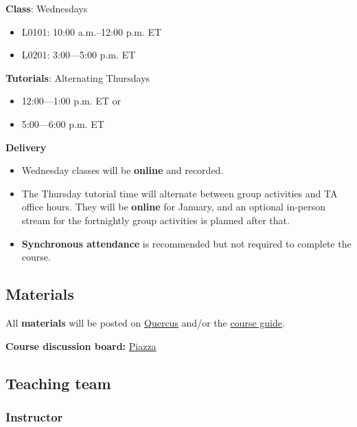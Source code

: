 \documentclass[
  openany]{book}
\providecommand{\tightlist}{%
  \setlength{\itemsep}{0pt}\setlength{\parskip}{0pt}}
\begin{document}
\textbf{Class}: Wednesdays

\begin{itemize}
\tightlist
\item
  L0101: 10:00 a.m.--12:00 p.m. ET
\item
  L0201: 3:00---5:00 p.m. ET
\end{itemize}

\textbf{Tutorials}: Alternating Thursdays

\begin{itemize}
\tightlist
\item
  12:00---1:00 p.m. ET or
\item
  5:00---6:00 p.m. ET
\end{itemize}

\textbf{Delivery}

\begin{itemize}
\item
  Wednesday classes will be \textbf{online} and recorded.
\item
  The Thursday tutorial time will alternate between group activities and TA office hours. They will be \textbf{online} for January, and an optional in-person stream for the fortnightly group activities is planned after that.
\item
  \textbf{Synchronous attendance} is recommended but not required to complete the course.
\end{itemize}

\hypertarget{materials}{%
\subsection{Materials}\label{materials}}

All \textbf{materials} will be posted on \href{https://q.utoronto.ca/courses/253305}{Quercus} and/or the \href{https://sta303-bolton.github.io/sta303-w22-courseguide/}{course guide}.

\textbf{Course discussion board:} \href{http://piazza.com/utoronto.ca/winter2022/sta303sta1002/home}{Piazza}

\hypertarget{teaching-team}{%
\subsection{Teaching team}\label{teaching-team}}

\hypertarget{instructor}{%
\subsubsection{\texorpdfstring{\textbf{Instructor}}{Instructor}}\label{instructor}}
\end{document}
